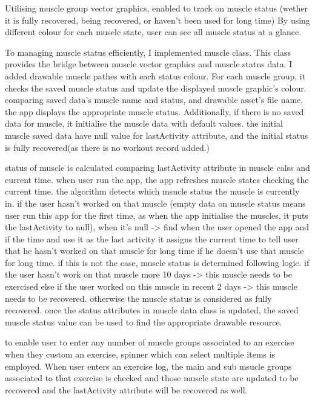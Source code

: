 
Utilising muscle group vector graphics, enabled to track on muscle status
(wether it is fully recovered, being recovered, or haven't been used for long time)
By using different colour for each muscle state, user can see all muscle status at a glance.

To managing muscle status efficiently, I implemented muscle class.
This class provides the bridge between muscle vector graphics and muscle status data.
I added drawable muscle pathes with each status colour. 
For each muscle group, it checks the saved muscle status and update the displayed muscle graphic's colour.
comparing saved data's muscle name and status, and drawable asset's file name, the app displays the appropriate muscle status.
Additionally, if there is no saved data for muscle, it initialise the muscle data with default values. 
the initial muscle saved data have null value for lastActivity attribute, and the initial status is fully recovered(as there is no workout record added.)

status of muscle is calculated comparing lastActivity attribute in muscle calss and current time.
when user run the app, the app refreshes muscle states checking the current time.
the algorithm detects which msucle status the muscle is currently in.
if the user hasn't worked on that muscle
(empty data on muscle status means user run this app for the first time, 
as when the app initialise the muscles, it puts the lastActivity to null), 
when it's null -> find when the user opened the app and if the time and use it as the last activity 
it assigns the current time to tell user that he hasn't worked on that muscle for long time if he doesn't use that muscle for long time.
if this is not the case, muscle status is determined following logic.
if the user hasn't work on that muscle more 10 days -> this muscle needs to be exercised
else if the user worked on this muscle in recent 2 days -> this muscle needs to be recovered.
otherwise the muscle status is considered as fully recovered.
once the status attributes in muscle data class is updated,
the saved muscle status value can be used to find the appropriate drawable resource.

to enable user to enter any number of muscle groups associated to an exercise when they custom an exercise,
spinner which can select multiple items is employed.
When user enters an exercise log, the main and sub msucle groups associated to that exercise is checked 
and those muscle state are updated to be recovered and the lastActivity attribute will be recovered as well.



